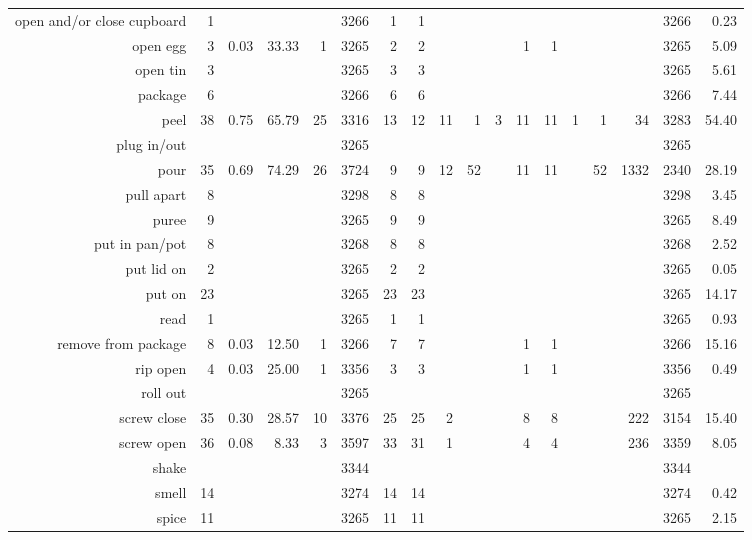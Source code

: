 \begin{tabular}{r r r@{\ \ }r@{\ \ }r@{\ \ }r@{\ \ }r r@{\ \ }r@{\ \ }r@{\ \ }r@{\ \ }r@{\ \ }r@{\ \ }r@{\ \ }r@{\ \ }r@{\ \ }r r}
open and/or close cupboard & 1 &  &  &  & 3266 & 1 & 1 &  &  &  &  &  &  &  &  & 3266 & 0.23 \\
open egg & 3 & 0.03 & 33.33 & 1 & 3265 & 2 & 2 &  &  &  & 1 & 1 &  &  &  & 3265 & 5.09 \\
open tin & 3 &  &  &  & 3265 & 3 & 3 &  &  &  &  &  &  &  &  & 3265 & 5.61 \\
package & 6 &  &  &  & 3266 & 6 & 6 &  &  &  &  &  &  &  &  & 3266 & 7.44 \\
peel & 38 & 0.75 & 65.79 & 25 & 3316 & 13 & 12 & 11 & 1 & 3 & 11 & 11 & 1 & 1 & 34 & 3283 & 54.40 \\
plug in/out &  &  &  &  & 3265 &  &  &  &  &  &  &  &  &  &  & 3265 &  \\
pour & 35 & 0.69 & 74.29 & 26 & 3724 & 9 & 9 & 12 & 52 &  & 11 & 11 &  & 52 & 1332 & 2340 & 28.19 \\
pull apart & 8 &  &  &  & 3298 & 8 & 8 &  &  &  &  &  &  &  &  & 3298 & 3.45 \\
puree & 9 &  &  &  & 3265 & 9 & 9 &  &  &  &  &  &  &  &  & 3265 & 8.49 \\
put in pan/pot & 8 &  &  &  & 3268 & 8 & 8 &  &  &  &  &  &  &  &  & 3268 & 2.52 \\
put lid on & 2 &  &  &  & 3265 & 2 & 2 &  &  &  &  &  &  &  &  & 3265 & 0.05 \\
put on & 23 &  &  &  & 3265 & 23 & 23 &  &  &  &  &  &  &  &  & 3265 & 14.17 \\
read & 1 &  &  &  & 3265 & 1 & 1 &  &  &  &  &  &  &  &  & 3265 & 0.93 \\
remove from package & 8 & 0.03 & 12.50 & 1 & 3266 & 7 & 7 &  &  &  & 1 & 1 &  &  &  & 3266 & 15.16 \\
rip open & 4 & 0.03 & 25.00 & 1 & 3356 & 3 & 3 &  &  &  & 1 & 1 &  &  &  & 3356 & 0.49 \\
roll out &  &  &  &  & 3265 &  &  &  &  &  &  &  &  &  &  & 3265 &  \\
screw close & 35 & 0.30 & 28.57 & 10 & 3376 & 25 & 25 & 2 &  &  & 8 & 8 &  &  & 222 & 3154 & 15.40 \\
screw open & 36 & 0.08 & 8.33 & 3 & 3597 & 33 & 31 & 1 &  &  & 4 & 4 &  &  & 236 & 3359 & 8.05 \\
shake &  &  &  &  & 3344 &  &  &  &  &  &  &  &  &  &  & 3344 &  \\
smell & 14 &  &  &  & 3274 & 14 & 14 &  &  &  &  &  &  &  &  & 3274 & 0.42 \\
spice & 11 &  &  &  & 3265 & 11 & 11 &  &  &  &  &  &  &  &  & 3265 & 2.15 \\

\end{tabular}
